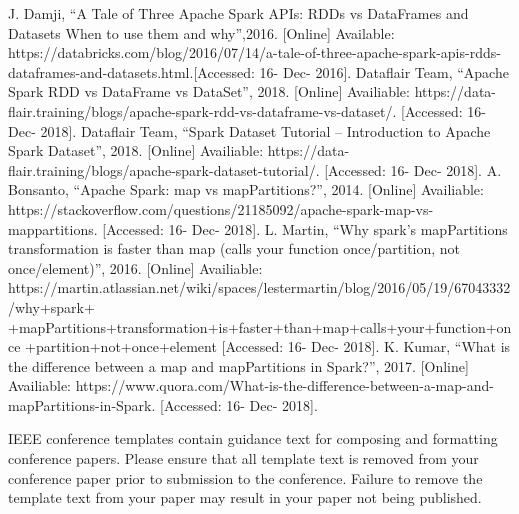 \documentclass[conference]{IEEEtran}
\begin{document}
\begin{thebibliography}{00}
 J. Damji, ``A Tale of Three Apache Spark APIs: RDDs vs DataFrames and Datasets
When to use them and why'',2016. [Online] Available: https://databricks.com/blog/2016/07/14/a-tale-of-three-apache-spark-apis-rdds-dataframes-and-datasets.html.[Accessed: 16- Dec- 2016].
 Dataflair Team, ``Apache Spark RDD vs DataFrame vs DataSet'', 2018. [Online] Availiable: https://data-flair.training/blogs/apache-spark-rdd-vs-dataframe-vs-dataset/. [Accessed: 16- Dec- 2018].
 Dataflair Team, ``Spark Dataset Tutorial – Introduction to Apache Spark Dataset'', 2018. [Online] Availiable: https://data-flair.training/blogs/apache-spark-dataset-tutorial/. [Accessed: 16- Dec- 2018].
 A. Bonsanto, ``Apache Spark: map vs mapPartitions?'', 2014. [Online] Availiable: https://stackoverflow.com/questions/21185092/apache-spark-map-vs-mappartitions. [Accessed: 16- Dec- 2018].
 L. Martin, ``Why spark's mapPartitions transformation is faster than map (calls your function once/partition, not once/element)'', 2016. [Online] Availiable: https://martin.atlassian.net/wiki/spaces/lestermartin/blog/2016/05/19/67043332/why+spark+
+mapPartitions+transformation+is+faster+than+map+calls+your+function+once
+partition+not+once+element [Accessed: 16- Dec- 2018].
 K. Kumar, ``What is the difference between a map and mapPartitions in Spark?'', 2017. [Online] Availiable: https://www.quora.com/What-is-the-difference-between-a-map-and-mapPartitions-in-Spark. [Accessed: 16- Dec- 2018].
\end{thebibliography}
\vspace{12pt}
\color{red}
IEEE conference templates contain guidance text for composing and formatting conference papers. Please ensure that all template text is removed from your conference paper prior to submission to the conference. Failure to remove the template text from your paper may result in your paper not being published.
\end{document}
